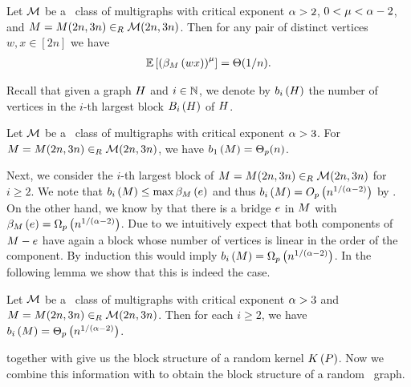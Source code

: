 \begin{lem}\label{CBlem:bridge_number4}
Let $\mathcal{M}$ be a \bridgeStable\ class of multigraphs with critical exponent $\alpha>2$, $0<\mu<\alpha-2$, and $M=M(2n,3n)\in_R \mathcal{M}(2n,3n)$. Then for any pair of distinct vertices $w, x \in [2n]$ we have
	\begin{align*}
	\mathbb{E}\left[\left(\beta_{M}\left(wx\right)\right)^\mu\right]=\Theta(1/n).
	\end{align*}
\end{lem}

Recall that given a graph $H$ and $i\in \mathbb{N}$, we denote by $b_{i}\left(H\right)$ the number of vertices in the $i$-th largest block $B_{i}\left(H\right)$ of $H$.
\begin{lem}\label{CBlem:bridge_number6}
Let $\mathcal{M}$ be a \bridgeStable\ class of multigraphs with critical exponent $\alpha>3$. For $M=M(2n,3n)\in_R \mathcal{M}(2n,3n)$, we have $b_{1}\left(M\right)=\Theta_p(n)$.
\end{lem}

Next, we consider the $i$-th largest block of $M=M(2n,3n)\in_R \mathcal{M}(2n,3n)$ for $i\geq 2$. We note that $b_{i}\left(M\right)\leq \max \beta_{M}\left(e\right)$ and thus $b_{i}\left(M\right)=O_p\left(n^{1/(\alpha-2)}\right)$ by . On the other hand, we know by  that there is a bridge $e$ in $M$ with $\beta_{M}\left(e\right)=\Omega_p\left(n^{1/(\alpha-2)}\right)$. Due to  we intuitively expect that both components of $M-e$ have again a block whose number of vertices is linear in the order of the component. By induction this would imply $b_{i}\left(M\right)=\Omega_p\left(n^{1/(\alpha-2)}\right)$. In the following lemma we show that this is indeed the case.

\begin{lem}\label{CBlem:bridge_number7}
	Let $\mathcal{M}$ be a \bridgeStable\ class of multigraphs with critical exponent $\alpha>3$ and $M=M(2n,3n)\in_R \mathcal{M}(2n,3n)$. Then for each $i\geq 2$, we have $b_{i}\left(M\right)=\Theta_p\left(n^{1/(\alpha-2)}\right)$. 
\end{lem}

 together with  give us the block structure of a random kernel $K\left(P\right)$. Now we combine this information with  to obtain the block structure of a random \pl\ graph.

